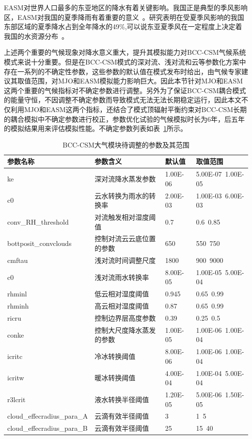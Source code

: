 EASM对世界人口最多的东亚地区的降水有着关键影响。我国正是典型的季风影响区，EASM对我国的夏季降雨有着重要的意义~\cite{王会军2013东亚季风近几十年来的主要变化特征}。研究表明在受夏季风影响的我国东部区域的夏季降水占到全年降水的49\%,可以说东亚夏季风在一定程度上决定着我国的水资源分布~\cite{周天军2018东亚夏季风变化机理的模拟和未来变化的预估}。

上述两个重要的气候现象对降水意义重大，提升其模拟能力对BCC-CSM气候系统模式来说十分重要。但是在BCC-CSM模式的深对流、浅对流和云等参数化方案中存在一系列的不确定性参数，这些参数的默认值在模式发布时给出，由气候专家建议其取值范围，对MJO和EASM模拟能力影响巨大。因此本节针对MJO和EASM这两个重要的气候指标对不确定参数进行调整。另外为了保证BCC-CSM耦合模式的能量守恒，不因调整不确定参数而导致模式无法无法长期稳定运行，因此本文不仅利用MJO和EASM这两个指标，还结合了模式顶辐射平衡约束对BCC-CSM长期的耦合模拟中不确定参数进行校正，参数优化试验的气候模拟时长为6年，后五年的模拟结果用来评估模拟性能。不确定参数列表如表~\ref{tab:bccparam}所示。

\begin{table}[H]
\centering
\caption{BCC-CSM大气模块待调整的参数及其范围}  
\begin{tabular}{llll}  
\toprule[1.5pt]
\centering
参数名称 & 参数含义 &默认值  & 取值范围 \\  
\hline  
 ke & 深对流降水蒸发参数 & 1.00E-06 & 5.00E-07~1.00E-05 \\
    c0 & 云水转换为雨水的转换率 & 2.00E-03 & 1.00E-03~6.00E-03 \\
    conv\_RH\_threshold & 对流触发相对湿度阈值 & 0.7   & 0.6~0.85 \\
    bottposit\_convclouds
 & 控制对流云云底位置的参数 & 650   & 550~750 \\
    cmftau & 浅对流时间调整尺度 & 1800  & 900~9000 \\
    c0 & 浅对流雨水转换率 & 8.00E-05 & 1.00E-05~5.00E-04 \\
    rhminl & 低云相对湿度阈值 & 0.945 & 0.65~0.99 \\
    rhminh & 高云相对湿度阈值 & 0.87  & 0.65~0.99 \\
    ricru & 控制边界层高度参数 & 0.39  & 0.25~0.5 \\
    conke & 控制大尺度降水蒸发的参数 & 1.00E-05 & 1.00E-06~1.00E-04 \\
    icritc & 冷冰转换阈值 & 8.00E-06 & 1.00E-06~1.00E-04 \\
    icritw & 暖冰转换阈值 & 4.00E-04 & 1.00E-04~5.00E-04 \\
    r3lcrit & 液水转换半径阈值 & 1.20E-05 & 5.00E-06~1.50E-05 \\
    cloud\_effecradius\_para\_A
 & 云滴有效半径阈值 & 3 & 1~5 \\
   cloud\_effecradius\_para\_B
 & 云滴有效半径阈值 & 25 & 15~40 \\
\bottomrule[1.5pt]  
\end{tabular} 
\label{tab:bccparam}
\end{table}

